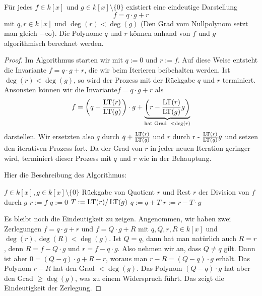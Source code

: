 \documentclass[11pt]{article}
\numberwithin{equation}{section}
\begin{document}
\begin{proposition}\label{prop:div:rest}
	Für jedes $f \in k[x]$ und $g \in k[x] \setminus \{0\}$ existiert eine eindeutige Darstellung 
	\[
		f = q \cdot g + r
	\]
	mit $q,r \in k[x]$ und $\deg(r) < \deg(g)$ (Den Grad vom Nullpolynom setzt man gleich $-\infty$). Die Polynome $q$ und $r$ können anhand von $f$ und $g$ algorithmisch berechnet werden. 
\end{proposition} 
\begin{proof} 
	Im Algorithmus starten wir mit $q:=0$ und $r:=f$. Auf diese Weise entsteht die Invariante $f = q \cdot g + r$, die wir beim Iterieren beibehalten werden. Ist $\deg(r)<\deg(g)$,  so wird der Prozess mit der Rückgabe $q$ und $r$ terminiert. Ansonsten können wir die Invariante$ f = q \cdot g + r$ als 
	\[
		 f = \left ( q  + \frac{\operatorname{LT}(r)}{\operatorname{LT}(g)}  \right) \cdot g  + \underbrace{\left( r -  \frac{\operatorname{LT}(r)}{\operatorname{LT}(g)} g \right)}_{\text{hat Grad \ } < \deg(r)}
	\]
	darstellen. 
	Wir ersetzten also $q$ durch $q  + \frac{\operatorname{LT}(r)}{\operatorname{LT}(g)}$ und $r$ durch r -  $\frac{\operatorname{LT}(r)}{\operatorname{LT}(g)} g $ und setzen den iterativen Prozess fort. Da der Grad von $r$ in jeder neuen Iteration geringer wird, terminiert dieser Prozess mit $q$ und $r$ wie in der Behauptung. 
	
	Hier die Beschreibung des Algorithmus: 
\begin{algorithm}[H]
	\caption{$\cc{Univariate-Division}(f,g)$}
	\begin{algorithmic}[1]
	\REQUIRE $f \in k[x], g \in k[x] \setminus \{0\}$
	\ENSURE Rückgabe von Quotient  $r$ und Rest $r$ der Division von $f$ durch $g$ 
		\STATE $r:=f$ 
		\STATE $q:=0$ 
		\STATE{}
		\STATE $T:= \operatorname{LT}(r)/\operatorname{LT}(g)$ 
		\STATE $q := q + T$  
		\STATE $r := r - T \cdot g$   
		\ENDWHILE 
	\end{algorithmic}
\end{algorithm}

	
	Es bleibt noch die Eindeutigkeit zu zeigen. Angenommen, wir haben zwei Zerlegungen $f  = q \cdot g + r$ und $f = Q \cdot g + R$ mit $q , Q, r,R \in k[x]$ und $\deg(r), \deg(R) < \deg(g)$. Ist $Q=q$, dann hat man natürlich auch $R =  r$, denn $R= f - Q \cdot g$ und $r = f - q \cdot g$. Also nehmen wir an, dass $Q \ne q$ gilt. Dann ist aber  $0 = (Q-q) \cdot g + R -r$, woraus man $r-R = (Q-q) \cdot g$ erhält. Das Polynom $r-R$ hat den Grad $< \deg(g)$. Das Polynom $(Q-q) \cdot g$ hat aber den Grad $\ge \deg(g)$, was zu einem Widerspruch führt. Das zeigt die Eindeutigkeit der Zerlegung. 
\end{proof} 
\end{document}
